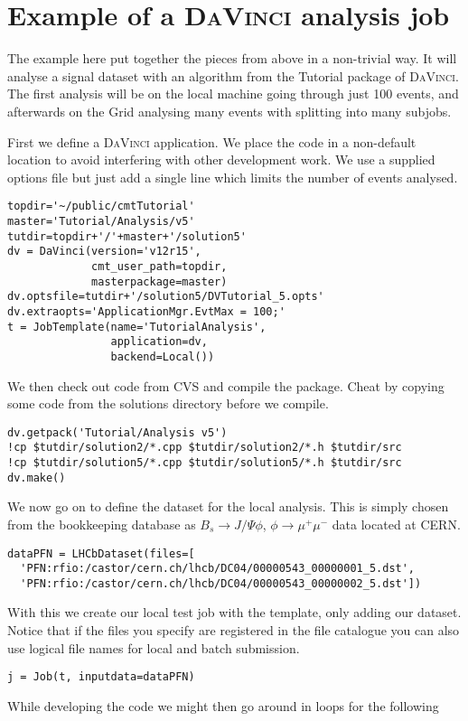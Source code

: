 \documentclass{howto}
\def\davinci {\textsc{DaVinci}\xspace}
\begin{document}
\section{Example of a \davinci analysis job}
\label{sec:Example}
The example here put together the pieces from above in a non-trivial way. It
will analyse a signal dataset with an algorithm from the Tutorial package of
\davinci. The first analysis will be on the local machine going through just
100 events, and afterwards on the Grid analysing many events with splitting
into many subjobs.

First we define a \davinci application. We place the code in a non-default
location to avoid interfering with other development work. We use a supplied
options file but just add a single line which limits the number of events
analysed.
\begin{verbatim}
topdir='~/public/cmtTutorial'
master='Tutorial/Analysis/v5'
tutdir=topdir+'/'+master+'/solution5'
dv = DaVinci(version='v12r15',
             cmt_user_path=topdir, 
             masterpackage=master)
dv.optsfile=tutdir+'/solution5/DVTutorial_5.opts'
dv.extraopts='ApplicationMgr.EvtMax = 100;'
t = JobTemplate(name='TutorialAnalysis',
                application=dv, 
                backend=Local())
\end{verbatim}
We then check out code from CVS and compile the package. Cheat by copying some
code from the solutions directory before we compile.
\begin{verbatim}
dv.getpack('Tutorial/Analysis v5')
!cp $tutdir/solution2/*.cpp $tutdir/solution2/*.h $tutdir/src
!cp $tutdir/solution5/*.cpp $tutdir/solution5/*.h $tutdir/src
dv.make()
\end{verbatim}
We now go on to define the dataset for the local analysis. This is simply
chosen from the bookkeeping database as $B_s \rightarrow J/\Psi \phi$, $\phi
\rightarrow \mu^+ \mu^-$ data located at CERN.
\begin{verbatim}
dataPFN = LHCbDataset(files=[
  'PFN:rfio:/castor/cern.ch/lhcb/DC04/00000543_00000001_5.dst',
  'PFN:rfio:/castor/cern.ch/lhcb/DC04/00000543_00000002_5.dst'])
\end{verbatim}
With this we create our local test job with the template, only adding our
dataset. Notice that if the files you specify are registered in the file
catalogue you can also use logical file names for local and batch submission.
\begin{verbatim}
j = Job(t, inputdata=dataPFN)
\end{verbatim}
While developing the code we might then go around in loops for the following
\end{document}
